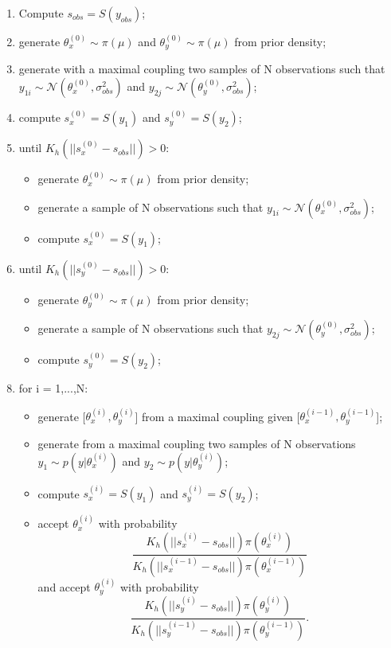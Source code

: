 \documentclass {article}
\begin{document}
\begin{enumerate}
	\item Compute $s_{obs} = S(y_{obs})$;
	\item generate $\theta_{x}^{(0)} \sim  \pi(\mu)$ and $\theta_{y}^{(0)} \sim  \pi(\mu)$ from prior density;
	\item generate with a maximal coupling two samples of N observations such that $y_{1i} \sim \mathcal{N}(\theta_{x}^{(0)}, \sigma_{obs} ^2)$ and  $y_{2j} \sim \mathcal{N}(\theta_{y}^{(0)}, \sigma_{obs} ^2)$;
	\item compute $s_{x}^{(0)}=S(y_{1})$ and $s_{y}^{(0)}=S(y_{2})$;
	\item until $K_h(||s_{x}^{(0)}-s_{obs}||)>0$:
	\begin{itemize}
		\item generate $\theta_{x}^{(0)} \sim  \pi(\mu)$ from prior density;
		\item generate a sample of N observations such that $y_{1i} \sim \mathcal{N}(\theta_{x}^{(0)}, \sigma_{obs} ^2)$;
		\item compute $s_{x}^{(0)}=S(y_{1})$;
	\end{itemize}
	\item until $K_h(||s_{y}^{(0)}-s_{obs}||)>0$:
	\begin{itemize}
		\item generate $\theta_{y}^{(0)} \sim  \pi(\mu)$ from prior density;
		\item generate a sample of N observations such that $y_{2j} \sim \mathcal{N}(\theta_{y}^{(0)}, \sigma_{obs} ^2)$;
		\item compute $s_{y}^{(0)}=S(y_{2})$;
	\end{itemize}
	
\end{enumerate}


\begin{enumerate}
	\setcounter{enumi}{7}	
	
	\item for i = 1,...,N:
	\begin{itemize}
		\item generate [$\theta_{x}^{(i)},\theta_{y}^{(i)}$] from a maximal coupling given [$\theta_{x}^{(i-1)},\theta_{y}^{(i-1)}$];
		\item generate from a maximal coupling two samples of N observations $y_{1} \sim p(y|\theta_{x}^{(i)})$ and $y_{2} \sim p(y|\theta_{y}^{(i)})$;
		\item compute $s_{x}^{(i)}=S(y_{1})$ and $s_{y}^{(i)}=S(y_{2})$;
		\item accept $\theta_{x}^{(i)}$ with probability 
		$$
		\frac{
			K_h(||s_{x}^{(i)}-s_{obs}||)\pi(\theta_{x}^{(i)})
		}{
			K_h(||s_{x}^{(i-1)}-s_{obs}||)\pi(\theta_{x}^{(i-1)})
		}
		$$
		and accept $\theta_{y}^{(i)}$ with probability
		$$
		\frac{
			K_h(||s_{y}^{(i)}-s_{obs}||)\pi(\theta_{y}^{(i)})
		}{
			K_h(||s_{y}^{(i-1)}-s_{obs}||)\pi(\theta_{y}^{(i-1)})
		}.
		$$ 
	\end{itemize}
	
	
\end{enumerate}
\end{document}

